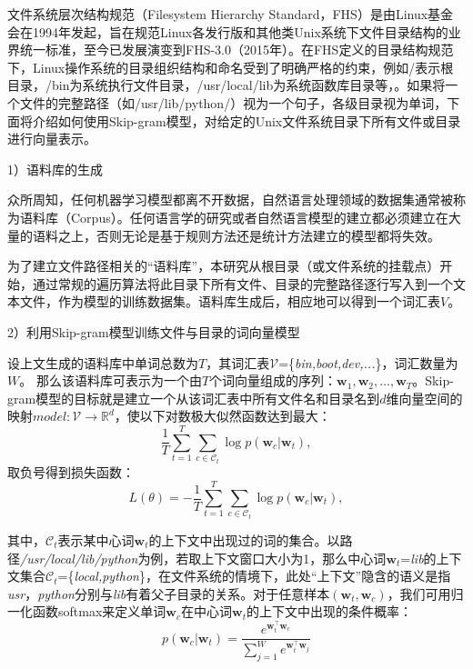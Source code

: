 文件系统层次结构规范（Filesystem Hierarchy Standard，FHS）\cite{fhs}是由Linux基金会在1994年发起，旨在规范Linux各发行版和其他类Unix系统下文件目录结构的业界统一标准，至今已发展演变到FHS-3.0（2015年）。在FHS定义的目录结构规范下，Linux操作系统的目录组织结构和命名受到了明确严格的约束，例如/表示根目录，/bin为系统执行文件目录，/usr/local/lib为系统函数库目录等，。如果将一个文件的完整路径（如/usr/lib/python/）视为一个句子，各级目录视为单词，下面将介绍如何使用Skip-gram模型，对给定的Unix文件系统目录下所有文件或目录进行向量表示。

1）语料库的生成

众所周知，任何机器学习模型都离不开数据，自然语言处理领域的数据集通常被称为语料库（Corpus）。任何语言学的研究或者自然语言模型的建立都必须建立在大量的语料之上，否则无论是基于规则方法还是统计方法建立的模型都将失效。

为了建立文件路径相关的“语料库”，本研究从根目录（或文件系统的挂载点）开始，通过常规的遍历算法将此目录下所有文件、目录的完整路径逐行写入到一个文本文件，作为模型的训练数据集。语料库生成后，相应地可以得到一个词汇表$V$。

2）利用Skip-gram模型训练文件与目录的词向量模型

设上文生成的语料库中单词总数为$T$，其词汇表$\mathcal{V}$=\{\textit{bin,boot,dev,...}\}，词汇数量为$W$。
那么该语料库可表示为一个由$T$个词向量组成的序列：$\mathbf{w}_1, \mathbf{w}_2, \dots, \mathbf{w}_T$。Skip-gram模型的目标就是建立一个从该词汇表中所有文件名和目录名到$d$维向量空间的映射$model:\mathcal{V} \rightarrow \mathbb{R}^d$，使以下对数极大似然函数达到最大：
\begin{equation}
    \label{eq:origin_object}
    \frac{1}{T}\sum_{t=1}^T \sum_{c \in \mathcal{C}_t} \log p(\mathbf{w}_c | \mathbf{w}_t),
\end{equation}
取负号得到损失函数：
\begin{equation}
    L(\theta)= -\frac{1}{T}\sum_{t=1}^T \sum_{c \in \mathcal{C}_t} \log p(\mathbf{w}_c | \mathbf{w}_t),
\end{equation}

其中，$\mathcal{C}_t$表示某中心词$\mathbf{w}_t$的上下文中出现过的词的集合。以路径\textit{/usr/local/lib/python}为例，若取上下文窗口大小为1，那么中心词$\mathbf{w}_t$=\textit{lib}的上下文集合$\mathcal{C}_t$=\{\textit{local,python}\}，在文件系统的情境下，此处“上下文”隐含的语义是指\textit{usr}，\textit{python}分别与\textit{lib}有着父子目录的关系。对于任意样本$(\mathbf{\mathbf{w}}_t,\mathbf{\mathbf{w}}_c)$，我们可用归一化函数softmax来定义单词$\mathbf{w}_c$在中心词$\mathbf{\mathbf{w}}_t$的上下文中出现的条件概率：
\begin{equation}
    \label{eq:softmax}
    p(\mathbf{w}_c | \mathbf{w}_t)=\frac{ e^{ \mathbf{w}_t^{\top} \mathbf{w}_c} }{ \sum_{j=1}^W e^{\mathbf{w}_t^{\top} \mathbf{w}_j}} 
\end{equation}

